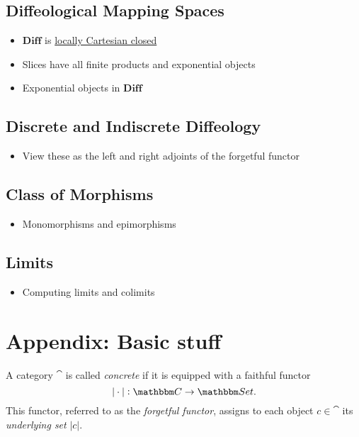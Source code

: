 \documentclass[a4paper,11pt,fleqn]{article}  %
\begin{document}
\subsection*{Diffeological Mapping Spaces}
\begin{itemize}
    \item $\textbf{Diff}$ is \href{https://ncatlab.org/nlab/show/locally+cartesian+closed+category}{locally Cartesian closed}
    \item Slices have all finite products and exponential objects
    \item Exponential objects in $\textbf{Diff}$
\end{itemize}

\subsection*{Discrete and Indiscrete Diffeology}
\begin{itemize}
    \item View these as the left and right adjoints of the forgetful functor
\end{itemize}

\subsection*{Class of Morphisms}
\begin{itemize}
    \item Monomorphisms and epimorphisms
\end{itemize}

\subsection*{Limits}
\begin{itemize}
    \item Computing limits and colimits
\end{itemize}



\appendix

\section*{Appendix: Basic stuff}

\begin{definition}\label{def:concrete_cat}
A category $\cat$ is called \emph{concrete} if it is equipped with a faithful functor 
$$
|\cdot| : \cat \to \Set.
$$
This functor, referred to as the \emph{forgetful functor}, assigns to each object $c \in \cat$ its \emph{underlying set} \(|c|\).
\end{definition}
\end{document}
